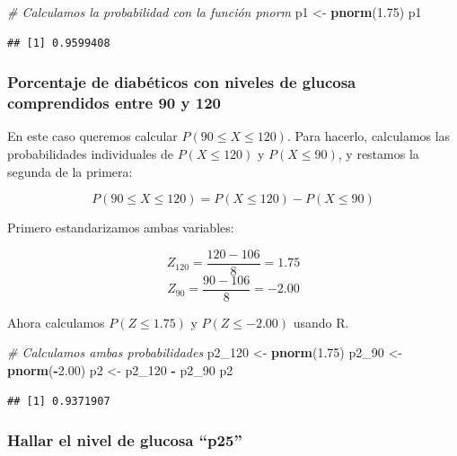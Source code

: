 \documentclass[
]{article}
\newenvironment{Shaded}{\begin{snugshade}}{\end{snugshade}}
\newcommand{\CommentTok}[1]{\textcolor[rgb]{0.56,0.35,0.01}{\textit{#1}}}
\newcommand{\FloatTok}[1]{\textcolor[rgb]{0.00,0.00,0.81}{#1}}
\newcommand{\FunctionTok}[1]{\textcolor[rgb]{0.13,0.29,0.53}{\textbf{#1}}}
\newcommand{\NormalTok}[1]{#1}
\newcommand{\OtherTok}[1]{\textcolor[rgb]{0.56,0.35,0.01}{#1}}
\newcommand{\SpecialCharTok}[1]{\textcolor[rgb]{0.81,0.36,0.00}{\textbf{#1}}}
\begin{document}
\begin{Shaded}
\begin{Highlighting}[]
\CommentTok{\# Calculamos la probabilidad con la función pnorm}
\NormalTok{p1 }\OtherTok{\textless{}{-}} \FunctionTok{pnorm}\NormalTok{(}\FloatTok{1.75}\NormalTok{)}
\NormalTok{p1}
\end{Highlighting}
\end{Shaded}

\begin{verbatim}
## [1] 0.9599408
\end{verbatim}

\subsubsection{Porcentaje de diabéticos con niveles de glucosa comprendidos entre 90 y 120}\label{porcentaje-de-diabuxe9ticos-con-niveles-de-glucosa-comprendidos-entre-90-y-120}

En este caso queremos calcular \(P(90 \leq X \leq 120)\). Para hacerlo, calculamos las probabilidades individuales de \(P(X \leq 120)\) y \(P(X \leq 90)\), y restamos la segunda de la primera:

\[ P(90 \leq X \leq 120) = P(X \leq 120) - P(X \leq 90) \]

Primero estandarizamos ambas variables:

\[ Z_{120} = \frac{120 - 106}{8} = 1.75 \]
\[ Z_{90} = \frac{90 - 106}{8} = -2.00 \]

Ahora calculamos \(P(Z \leq 1.75)\) y \(P(Z \leq -2.00)\) usando R.

\begin{Shaded}
\begin{Highlighting}[]
\CommentTok{\# Calculamos ambas probabilidades}
\NormalTok{p2\_120 }\OtherTok{\textless{}{-}} \FunctionTok{pnorm}\NormalTok{(}\FloatTok{1.75}\NormalTok{)}
\NormalTok{p2\_90 }\OtherTok{\textless{}{-}} \FunctionTok{pnorm}\NormalTok{(}\SpecialCharTok{{-}}\FloatTok{2.00}\NormalTok{)}
\NormalTok{p2 }\OtherTok{\textless{}{-}}\NormalTok{ p2\_120 }\SpecialCharTok{{-}}\NormalTok{ p2\_90}
\NormalTok{p2}
\end{Highlighting}
\end{Shaded}

\begin{verbatim}
## [1] 0.9371907
\end{verbatim}

\subsubsection{Hallar el nivel de glucosa ``p25''}\label{hallar-el-nivel-de-glucosa-p25}
\end{document}
